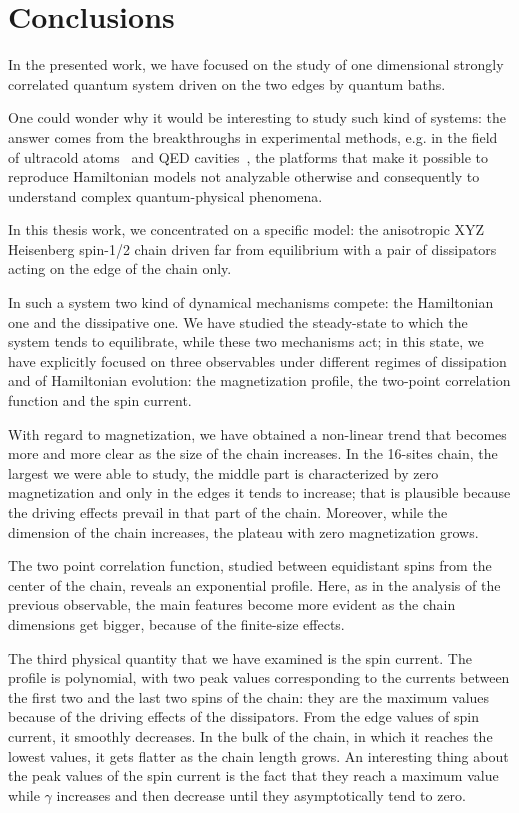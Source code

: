 \chapter*{Conclusions}
 

\label{Conclusions}

In the presented work, we have focused on the study of one dimensional strongly correlated quantum system driven on the two edges by quantum baths. %

One could wonder why it would be interesting to study such kind of systems: the answer comes from the breakthroughs in  experimental methods, e.g. in the field of ultracold atoms~\cite{ultracoldAtoms_condMatter} and QED cavities~\cite{Tomadin_Fazio, Nat.Phys2012}, the platforms that make it possible to reproduce Hamiltonian models not analyzable otherwise and consequently to understand complex quantum-physical phenomena. 

In this thesis work, we concentrated on a specific model: the anisotropic XYZ Heisenberg spin-1/2 chain driven far from equilibrium with a pair of dissipators acting on the edge of the chain only.

In such a system two kind of dynamical mechanisms compete: the Hamiltonian one and the dissipative one. We have studied the steady-state to which the system tends to equilibrate, while these two mechanisms act; in this state, we have explicitly focused on three observables under different regimes of dissipation and of Hamiltonian evolution: the magnetization profile, the two-point correlation function and the spin current.

With regard to magnetization, we have obtained a non-linear trend that becomes more and more clear as the size of the chain increases. In the 16-sites chain, the largest we were able to study, the middle part is characterized by zero magnetization and only in the edges it tends to increase; that is plausible because the driving effects prevail in that part of the chain. Moreover, while the dimension of the chain increases, the plateau with zero magnetization grows. 

The two point correlation function, studied between equidistant spins from the center of the chain, reveals an exponential profile. Here, as in the analysis of the previous observable, the main features become more evident as the chain dimensions get bigger, because of the finite-size effects.

The third physical quantity that we have examined is the spin current. The profile is polynomial, with two peak values corresponding to the currents between the first two and the last two spins of the chain: they are the maximum values because of the driving effects of the dissipators. From the edge values of spin current, it smoothly decreases. In the bulk of the chain, in which it reaches the lowest values, it gets flatter as the chain length grows. An interesting thing about the peak values of the spin current is the fact that they reach a maximum value while $\gamma$ increases and then decrease until they  asymptotically tend to zero.

